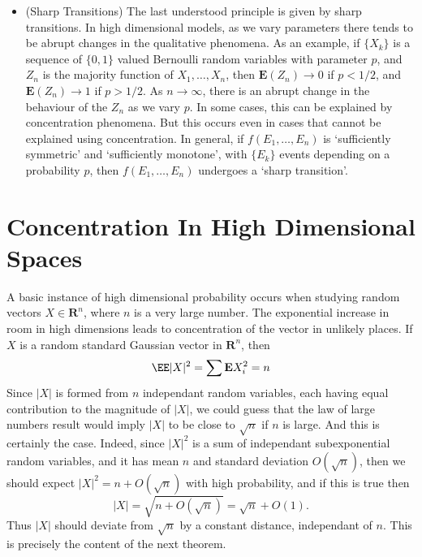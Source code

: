 \begin{itemize}
    \item (Sharp Transitions) The last understood principle is given by sharp transitions. In high dimensional models, as we vary parameters there tends to be abrupt changes in the qualitative phenomena. As an example, if $\{ X_k \}$ is a sequence of $\{ 0, 1 \}$ valued Bernoulli random variables with parameter $p$, and $Z_n$ is the majority function of $X_1, \dots, X_n$, then $\mathbf{E}(Z_n) \to 0$ if $p < 1/2$, and $\mathbf{E}(Z_n) \to 1$ if $p > 1/2$. As $n \to \infty$, there is an abrupt change in the behaviour of the $Z_n$ as we vary $p$. In some cases, this can be explained by concentration phenomena. But this occurs even in cases that cannot be explained using concentration. In general, if $f(E_1, \dots, E_n)$ is `sufficiently symmetric' and `sufficiently monotone', with $\{ E_k \}$ events depending on a probability $p$, then $f(E_1, \dots, E_n)$ undergoes a `sharp transition'.
\end{itemize}











\chapter{Concentration In High Dimensional Spaces}

A basic instance of high dimensional probability occurs when studying random vectors $X \in \mathbf{R}^n$, where $n$ is a very large number. The exponential increase in room in high dimensions leads to concentration of the vector in unlikely places. If $X$ is a random standard Gaussian vector in $\mathbf{R}^n$, then
%
\[ \EE |X|^2 = \sum \mathbf{E} X_i^2 = n \]
%
Since $|X|$ is formed from $n$ independant random variables, each having equal contribution to the magnitude of $|X|$, we could guess that the law of large numbers result would imply $|X|$ to be close to $\sqrt{n}$ if $n$ is large. And this is certainly the case. Indeed, since $|X|^2$ is a sum of independant subexponential random variables, and it has mean $n$ and standard deviation $O(\sqrt{n})$, then we should expect $|X|^2 = n + O(\sqrt{n})$ with high probability, and if this is true then
%
\[ |X| = \sqrt{n + O \left(\sqrt{n}\right) } = \sqrt{n} + O(1). \]
%
Thus $|X|$ should deviate from $\sqrt{n}$ by a constant distance, independant of $n$. This is precisely the content of the next theorem.

